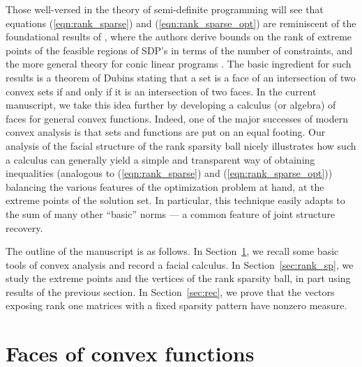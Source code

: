 \documentclass[smallextended,numbook]{svjour3}
\begin{document}
Those well-versed in the theory of semi-definite programming will see that equations (\ref{eqn:rank_sparse}) and (\ref{eqn:rank_sparse_opt}) are reminiscent of the foundational results of \cite{P_ext,B_ext}, where the authors derive bounds on the rank of extreme points of the feasible regions of SDP's in terms of the number of constraints, and the more general theory for conic linear programs \cite{handbook}. 
The basic ingredient for such results is a theorem of Dubins \cite[Page 116]{SW} stating that a set is a face of an intersection of two convex sets if and only if it is an intersection of two faces. In the current manuscript, we take this idea further by developing a calculus (or algebra) of faces for general convex functions.
Indeed, one of the major successes of modern convex analysis is that sets and functions are put on an equal footing. Our analysis of the facial structure of the rank sparsity ball nicely illustrates how such a calculus can generally yield a simple and transparent way of obtaining inequalities (analogous to (\ref{eqn:rank_sparse}) and (\ref{eqn:rank_sparse_opt})) balancing the various  features of the optimization problem at hand, 
at the extreme points of the solution set. In particular, this technique easily adapts to the sum of many other ``basic'' norms --- a common feature of joint structure recovery.

The outline of the manuscript is as follows. In Section~\ref{sec:face}, we recall some basic tools of convex analysis and record a facial calculus. In Section~\ref{sec:rank_sp}, we study the extreme points and the vertices of the rank sparsity ball, in part using results of the previous section. In Section~\ref{sec:rec}, we prove that the vectors exposing rank one matrices with a fixed sparsity pattern  have nonzero measure. 
  

\section{Faces of convex functions}\label{sec:face}
\end{document}
